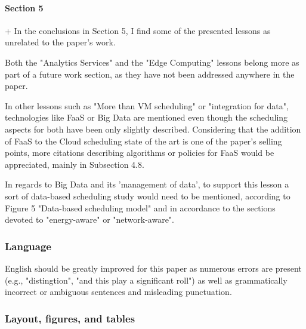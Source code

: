 \paragraph{Section 5}

+ In the conclusions in Section 5, I find some of the presented lessons as unrelated to the paper's work.

Both the "Analytics Services" and the "Edge Computing" lessons belong more as part of a future work section, as they have not been addressed anywhere in the paper.



In other lessons such as "More than VM scheduling" or "integration for data", technologies like FaaS or Big Data are mentioned even though the scheduling aspects for both have been only slightly described. Considering that the addition of FaaS to the Cloud scheduling state of the art is one of the paper's selling points, more citations describing algorithms or policies for FaaS would be appreciated, mainly in Subsection 4.8.


In regards to Big Data and its 'management of data', to support this lesson a sort of data-based scheduling study would need to be mentioned, according to Figure 5 "Data-based scheduling model" and in accordance to the sections devoted to "energy-aware" or "network-aware".




\subsubsection{Language}

English should be greatly improved for this paper as numerous errors are present (e.g., "distingtion", "and this play a significant roll") as well as grammatically incorrect or ambiguous sentences and misleading punctuation.



\subsubsection{Layout, figures, and tables}


